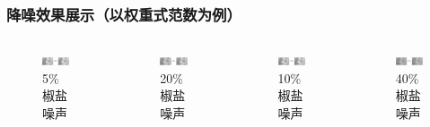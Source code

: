 \documentclass[10pt,aspectratio=43,mathserif]{beamer}
\begin{document}
\begin{frame}
\frametitle{\textbf{降噪效果展示（以权重式范数为例）}}
\begin{columns}
\begin{figure}
\centering
\includegraphics[scale=0.25]{Screenshot_5.png}
\caption{5\%椒盐噪声}
\end{figure}

\begin{figure}
\centering
\includegraphics[scale=0.25]{Screenshot_7.png}
\caption{20\%椒盐噪声}
\end{figure}

\begin{figure}
\centering
\includegraphics[scale=0.25]{Screenshot_6.png}
\caption{10\%椒盐噪声}
\end{figure}

\begin{figure}
\centering
\includegraphics[scale=0.25]{Screenshot_8.png}
\caption{40\%椒盐噪声}
\end{figure}
	
\end{columns}
\end{frame}
\end{document}
